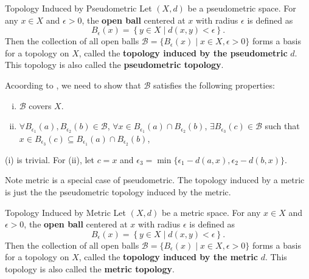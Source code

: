 \documentclass{report}
\begin{document}
\begin{definition}{Topology Induced by Pseudometric}{}
	Let $(X,d)$ be a pseudometric space. For any $x\in X$ and $\epsilon>0$, the \textbf{open ball} centered at $x$ with radius $\epsilon$ is defined as
	\[B_\epsilon(x)=\left\{y\in X\mid d(x,y)<\epsilon\right\}.\]
	Then the collection of all open balls $\mathcal{B}=\{B_\epsilon(x)\mid x\in X,\epsilon>0\}$ forms a basis for a topology on $X$, called the \textbf{topology induced by the pseudometric} $d$. This topology is also called the \textbf{pseudometric topology}.
\end{definition}
\begin{prf}
	Acoording to , we need to show that $\mathcal{B}$ satisfies the following properties:
	\begin{enumerate}[(i)]
		\item $\mathcal{B}$ covers $X$.
		\item $\forall B_{\epsilon_1}(a),B_{\epsilon_2}(b)\in\mathcal{B}$, $\forall x\in B_{\epsilon_1}(a)\cap B_{\epsilon_2}(b)$, $\exists B_{\epsilon_3}(c)\in \mathcal{B}$ such that $x\in B_{\epsilon_3}(c)\subseteq B_{\epsilon_1}(a)\cap B_{\epsilon_2}(b)$,
	\end{enumerate}
	(i) is trivial. For (ii), let $c=x$ and $\epsilon_3=\min\{\epsilon_1-d(a,x),\epsilon_2-d(b,x)\}$.
\end{prf}

Note metric is a special case of pseudometric. The topology induced by a metric is just the the pseudometric topology induced by the metric.

\begin{definition}{Topology Induced by Metric}
	Let $(X,d)$ be a metric space. For any $x\in X$ and $\epsilon>0$, the \textbf{open ball} centered at $x$ with radius $\epsilon$ is defined as
	\[
		B_\epsilon(x)=\left\{y\in X\mid d(x,y)<\epsilon\right\}.
	\]
	Then the collection of all open balls $\mathcal{B}=\{B_\epsilon(x)\mid x\in X,\epsilon>0\}$ forms a basis for a topology on $X$, called the \textbf{topology induced by the metric} $d$. This topology is also called the \textbf{metric topology}.
\end{definition}
\end{document}
